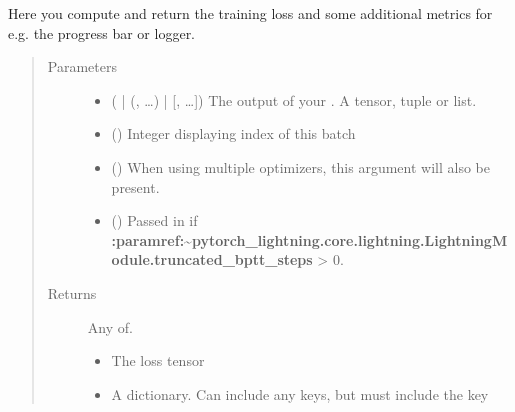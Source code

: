 \documentclass[letterpaper,10pt,english]{sphinxmanual}
\begin{document}
\begin{fulllineitems}
\begin{fulllineitems}
\label{\detokenize{pages/ml:vipercore.ml.plmodels.AEModel.training_step}}
\sphinxAtStartPar
Here you compute and return the training loss and some additional metrics for e.g.
the progress bar or logger.
\begin{quote}\begin{description}
\item[{Parameters}] \leavevmode\begin{itemize}
\item {} 
\sphinxAtStartPar
{} ( | (, …) | {[}, …{]}) \textendash{} The output of your . A tensor, tuple or list.

\item {} 
\sphinxAtStartPar
{} () \textendash{} Integer displaying index of this batch

\item {} 
\sphinxAtStartPar
{} () \textendash{} When using multiple optimizers, this argument will also be present.

\item {} 
\sphinxAtStartPar
{} () \textendash{} Passed in if
{\color{red}\bfseries{}:paramref:\textasciigrave{}\textasciitilde{}pytorch\_lightning.core.lightning.LightningModule.truncated\_bptt\_steps\textasciigrave{}} \textgreater{} 0.

\end{itemize}

\item[{Returns}] \leavevmode
\sphinxAtStartPar

\sphinxAtStartPar
Any of.
\begin{itemize}
\item {} 
\sphinxAtStartPar
{} \sphinxhyphen{} The loss tensor

\item {} 
\sphinxAtStartPar
{} \sphinxhyphen{} A dictionary. Can include any keys, but must include the key 


\end{itemize}
\end{description}
\end{quote}
\end{fulllineitems}
\end{fulllineitems}
\end{document}
